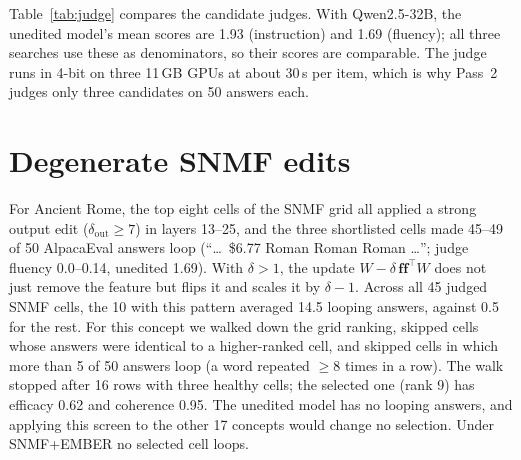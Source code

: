 \documentclass[11pt]{article}
\begin{document}
\begin{table}[h]
\centering\small
\setlength{\tabcolsep}{3.5pt}
\caption{Agreement with Gemini on the same 150 AlpacaEval completions (scores 0--2). Acceptance band for the mean difference: $\pm 0.15$. Qwen2.5-14B fails on fluency even with a prompt adapted to it; Qwen2.5-32B passes with Gemini's original prompts.}
\label{tab:judge}
\end{table}

Table~\ref{tab:judge} compares the candidate judges.
With Qwen2.5-32B, the unedited model's mean scores are 1.93 (instruction) and 1.69 (fluency); all three searches use these as denominators, so their scores are comparable.
The judge runs in 4-bit on three 11\,GB GPUs at about 30\,s per item, which is why Pass~2 judges only three candidates on 50 answers each.

\section{Degenerate SNMF edits}
\label{app:loop}

For Ancient Rome, the top eight cells of the SNMF grid all applied a strong output edit ($\delta_{\text{out}} \geq 7$) in layers 13--25, and the three shortlisted cells made 45--49 of 50 AlpacaEval answers loop (``\ldots\ \$6.77 Roman Roman Roman \ldots''; judge fluency 0.0--0.14, unedited 1.69).
With $\delta > 1$, the update $W - \delta\,\mathbf{f}\mathbf{f}^\top W$ does not just remove the feature but flips it and scales it by $\delta - 1$.
Across all 45 judged SNMF cells, the 10 with this pattern averaged 14.5 looping answers, against 0.5 for the rest.
For this concept we walked down the grid ranking, skipped cells whose answers were identical to a higher-ranked cell, and skipped cells in which more than 5 of 50 answers loop (a word repeated $\geq 8$ times in a row).
The walk stopped after 16 rows with three healthy cells; the selected one (rank 9) has efficacy 0.62 and coherence 0.95.
The unedited model has no looping answers, and applying this screen to the other 17 concepts would change no selection.
Under SNMF+EMBER no selected cell loops.
\end{document}

